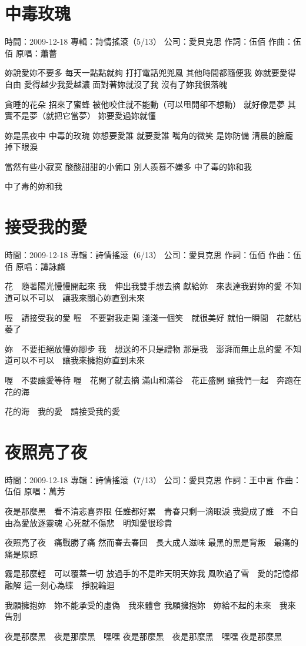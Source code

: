 \documentclass[UTF8,a4paper,oneside,twocolumn,12pt]{ctexbook}
\newcommand{\infopair}[2]{\textbullet #1：#2}
\newcommand{\zc}[1][伍佰]{\infopair{作詞}{#1}}
\newcommand{\zq}[1][伍佰]{\infopair{作曲}{#1}}
\newcommand{\zj}[1]{\infopair{專輯}{#1}}
\newcommand{\yc}[1]{\infopair{原唱}{#1}}
\newcommand{\sj}[1]{\infopair{時間}{#1}}
\newcommand{\gs}[1]{\infopair{公司}{#1}}
\newenvironment{info}{\begin{flushleft}\kaishu
	}
	{\end{flushleft}\normalsize\yahei\par}
\newenvironment{lyric}{
	}
{}
\begin{document}
\section{中毒玫瑰}
\begin{info}
	\sj{2009-12-18}
	\zj{詩情搖滾（5/13）}
	\gs{愛貝克思}
	\zc
	\zq
	\yc{蕭薔}
\end{info}
\begin{lyric}
	妳說愛妳不要多 每天一點點就夠
	打打電話兜兜風 其他時間都隨便我
	妳就要愛得自由 愛得越少我愛越濃
	面對著妳就沒了我 沒有了妳我很落魄

	貪睡的花朵 招來了蜜蜂
	被他咬住就不能動（可以甩開卻不想動）
	就好像是夢 其實不是夢（就把它當夢）
	妳要愛過妳就懂

	妳是黑夜中 中毒的玫瑰
	妳想要愛誰 就要愛誰
	嘴角的微笑 是妳防備
	清晨的臉龐 掉下眼淚

	當然有些小寂寞 酸酸甜甜的小倆口
	別人羨慕不嫌多 中了毒的妳和我

	中了毒的妳和我
\end{lyric}

\section{接受我的愛}
\begin{info}
	\sj{2009-12-18}
	\zj{詩情搖滾（6/13）}
	\gs{愛貝克思}
	\zc
	\zq
	\yc{譚詠麟}
\end{info}
\begin{lyric}
	花　隨著陽光慢慢開起來
	我　伸出我雙手想去摘
	獻給妳　來表達我對妳的愛
	不知道可以不可以　讓我來關心妳直到未來

	喔　請接受我的愛
	喔　不要對我走開
	淺淺一個笑　就很美好
	就怕一瞬間　花就枯萎了

	妳　不要拒絕放慢妳腳步
	我　想送的不只是禮物
	那是我　澎湃而無止息的愛
	不知道可以不可以　讓我來擁抱妳直到未來

	喔　不要讓愛等待
	喔　花開了就去摘
	滿山和滿谷　花正盛開
	讓我們一起　奔跑在花的海

	花的海　我的愛　請接受我的愛
\end{lyric}

\section{夜照亮了夜}
\begin{info}
	\sj{2009-12-18}
	\zj{詩情搖滾（7/13）}
	\gs{愛貝克思}
	\zc[王中言]
	\zq
	\yc{萬芳}
\end{info}
\begin{lyric}
	夜是那麼黑　看不清悲喜界限
	任誰都好累　青春只剩一滴眼淚
	我變成了誰　不自由為愛放逐靈魂
	心死就不傷悲　明知愛很珍貴

	夜照亮了夜　痛戰勝了痛
	然而春去春回　長大成人滋味
	最黑的黑是背叛　最痛的痛是原諒

	霧是那麼輕　可以覆蓋一切
	放過手的不是昨天明天妳我
	風吹過了雪　愛的記憶都融解
	這一刻心為蝶　掙脫輪迴

	我願擁抱妳　妳不能承受的虛偽　我來體會
	我願擁抱妳　妳給不起的未來　我來告別

	夜是那麼黑　夜是那麼黑　嘿嘿
	夜是那麼黑　夜是那麼黑　嘿嘿
	夜是那麼黑
\end{lyric}
\end{document}
